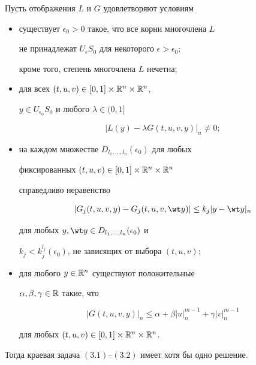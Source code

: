 \begin{thms}


Пусть отображения $L$ и $G$ удовлетворяют условиям


\begin{itemize}


\item[(A)] существует $\epsilon_0>0$ такое, что все корни многочлена $L$


не принадлежат $U_\epsilon S_0$ для некоторого $\epsilon>\epsilon_0;$


кроме того, степень многочлена $L$ нечетна$;$


\item[(B)] для всех $(t,u,v)\in [0,1] \times {\Bbb R}^n\times {\Bbb R}^n$,


$y\in U_{\epsilon_0} S_0$ и любого $\lambda \in (0,1]$


$$


|L(y)- \lambda G(t,u,v,y)|_n\neq 0;


$$


\item[(C)] на каждом множестве $D_{l_1,\dotsc,l_n}(\epsilon_0)$ для любых


фиксированных $(t,u,v)\in [0,1]\times {\Bbb R}^n\times {\Bbb R}^n$


справедливо неравенство


$$


|G_j(t,u,v,y) - G_j(t,u,v,\wt y)|\leq k_j|y-\wt y|_n


$$


для любых $y,\wt y\in D_{l_1,\dotsc, l_n}(\epsilon_0)$ и


$k_j<k_j^{l_j}(\epsilon_0)$, не зависящих от выбора $(t,u,v);$


\item[(D)] для любого $y\in {\Bbb R}^n$ существуют положительные


$\alpha, \beta, \gamma \in {\Bbb R}$ такие, что


$$


|G(t,u,v,y)|_n\leq \alpha + \beta |u|_n^{m-1} + \gamma |v|_n^{m-1}


$$


для любых $(t,u,v)\in [0,1]\times {\Bbb R}^n\times {\Bbb R}^n$.


\end{itemize}





Тогда краевая задача $(3.1)$--$(3.2)$ имеет хотя бы одно решение.


\end{thms}





